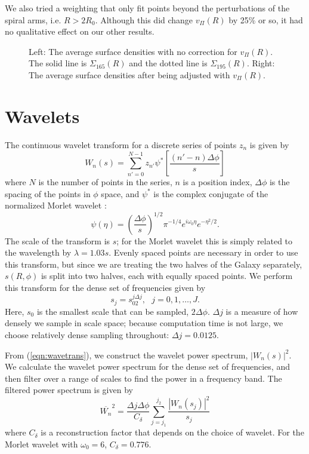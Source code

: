 \documentclass[apj]{emulateapj}
\begin{document}
We also tried a weighting that only  fit points beyond the perturbations of the spiral arms, i.e. $R>2R_0$. Although this did change $v_\Pi(R)$ by 25\% or so, it had no qualitative effect on our other results.



\begin{figure}
\caption{\label{fig:sigmatch} Left: The average surface densities with no correction for $v_\Pi(R)$.  The solid line is $\Sigma_{165}(R)$ and the dotted line is $\Sigma_{195}(R)$. Right: The average surface densities after being adjusted with $v_\Pi(R)$.}
\end{figure}



\section{Wavelets}

The continuous wavelet transform for a discrete series of points $z_n$ is given by
\begin{equation}\label{eqn:wavetrans}
W_n(s)=\sum^{N-1}_{n'=0} z_{n'} \psi^*\left[
\frac{(n'-n)\Delta\phi}{s}\right]
\end{equation}
where $N$ is the number of points in the series, $n$ is a position index,  $\Delta\phi$ is the spacing of the points in $\phi$ space, and $\psi^*$ is the complex conjugate of the normalized Morlet wavelet \citep{TC1998}:  
\begin{equation}
\psi\left(\eta\right)
=\left(\frac{\Delta\phi}{s}\right)^{1/2}\pi^{-1/4}e^{i\omega_0\eta}e^{-\eta^2/2}.
\end{equation}
The scale of the transform is $s$; for the Morlet wavelet this is simply related to the wavelength by $\lambda=1.03s$. Evenly spaced points are necessary in order to use this transform, but since we are treating the two halves of the Galaxy separately, $s(R,\phi)$ is  split into two halves, each with equally spaced points.  We perform this transform for the dense set of frequencies given by 
\begin{equation}
s_j=s_02^{j\Delta j}, ~~~j=0,1,\ldots,J.
\end{equation}
Here, $s_0$ is the smallest scale that can be sampled, $2\Delta\phi$. $\Delta j$ is a measure of how densely we sample in  scale space; because computation time is not large, we  choose relatively dense sampling throughout: $\Delta j = 0.0125$. 

From (\ref{eqn:wavetrans}), we construct the wavelet power spectrum, $\left|W_n(s)\right|^2$.
We calculate the wavelet power spectrum for the dense set of frequencies, and then filter over a range of scales to find the power in a frequency band. The filtered power spectrum is given by
\begin{equation}
\overline{W_n}^2=\frac{\Delta j\Delta \phi}{C_\delta}\sum_{j=j_1}^{j_2}\frac{\left|W_n(s_j)\right|^2}{s_j}
\end{equation}
where $C_\delta$ is a reconstruction factor that depends on the choice of wavelet. For the Morlet wavelet with $\omega_0 =6$, $C_\delta=0.776$.
\end{document}
